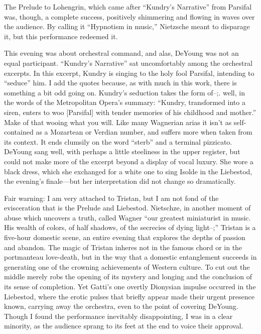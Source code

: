 The Prelude to Lohengrin, which came after “Kundry’s Narrative” from Parsifal was, though, a complete success, positively shimmering and flowing in waves over the audience. By calling it “Hypnotism in music,” Nietzsche meant to disparage it, but this performance redeemed it.

This evening was about orchestral command, and alas, DeYoung was not an equal participant. “Kundry’s Narrative” sat uncomfortably among the orchestral excerpts. In this excerpt, Kundry is singing to the holy fool Parsifal, intending to “seduce” him. I add the quotes because, as with much in this work, there is something a bit odd going on. Kundry’s seduction takes the form of--;. well, in the words of the Metropolitan Opera’s summary: “Kundry, transformed into a siren, enters to woo [Parsifal] with tender memories of his childhood and mother.” Make of that wooing what you will. Like many Wagnerian arias it isn’t as self-contained as a Mozartean or Verdian number, and suffers more when taken from its context. It ends clumsily on the word “sterb” and a terminal pizzicato. DeYoung sang well, with perhaps a little steeliness in the upper register, but could not make more of the excerpt beyond a display of vocal luxury. She wore a black dress, which she exchanged for a white one to sing Isolde in the Liebestod, the evening’s finale—but her interpretation did not change so dramatically.

Fair warning: I am very attached to Tristan, but I am not fond of the evisceration that is the Prelude and Liebestod. Nietschze, in another moment of abuse which uncovers a truth, called Wagner “our greatest miniaturist in music. His wealth of colors, of half shadows, of the secrecies of dying light--;” Tristan is a five-hour domestic scene, an entire evening that explores the depths of passion and abandon. The magic of Tristan inheres not in the famous chord or in the portmanteau love-death, but in the way that a domestic entanglement succeeds in generating one of the crowning achievements of Western culture. To cut out the middle merely robs the opening of its mystery and longing and the conclusion of its sense of completion. Yet Gatti’s one overtly Dionysian impulse occurred in the Liebestod, where the erotic pulses that briefly appear made their urgent presence known, carrying away the orchestra, even to the point of covering DeYoung. Though I found the performance inevitably disappointing, I was in a clear minority, as the audience sprang to its feet at the end to voice their approval.


